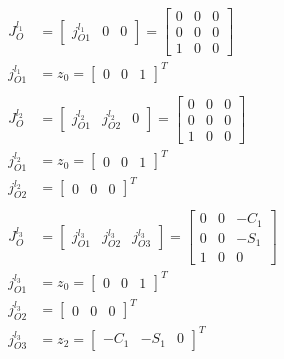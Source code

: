 \begin{minipage}[h]{0.3\textwidth}
\begin{align*}
J_O^{l_1}&=\begin{bmatrix}
j_{O1}^{l_1} & 0 & 0
\end{bmatrix}=\begin{bmatrix}
0&0&0\\0&0&0\\1&0&0
\end{bmatrix}\\
j_{O1}^{l_1}&=z_0=\begin{bmatrix}
0&0&1
\end{bmatrix}^T\\\\
J_O^{l_2}&=\begin{bmatrix}
j_{O1}^{l_2} & j_{O2}^{l_2} & 0
\end{bmatrix}=\begin{bmatrix}
0&0&0\\0&0&0\\1&0&0
\end{bmatrix}\\
j_{O1}^{l_2}&=z_0=\begin{bmatrix}
0&0&1
\end{bmatrix}^T\\
j_{O2}^{l_2}&=\begin{bmatrix}
0&0&0
\end{bmatrix}^T\\\\
J_O^{l_3}&=\begin{bmatrix}
j_{O1}^{l_3} & j_{O2}^{l_3} & j_{O3}^{l_3}
\end{bmatrix}=\begin{bmatrix}
0&0&-C_1\\0&0&-S_1\\1&0&0
\end{bmatrix}\\
j_{O1}^{l_3}&=z_0=\begin{bmatrix}
0&0&1
\end{bmatrix}^T\\
j_{O2}^{l_3}&=\begin{bmatrix}
0&0&0
\end{bmatrix}^T\\
j_{O3}^{l_3}&=z_2=\begin{bmatrix}
-C_1&-S_1&0
\end{bmatrix}^T
\end{align*}
\end{minipage}


